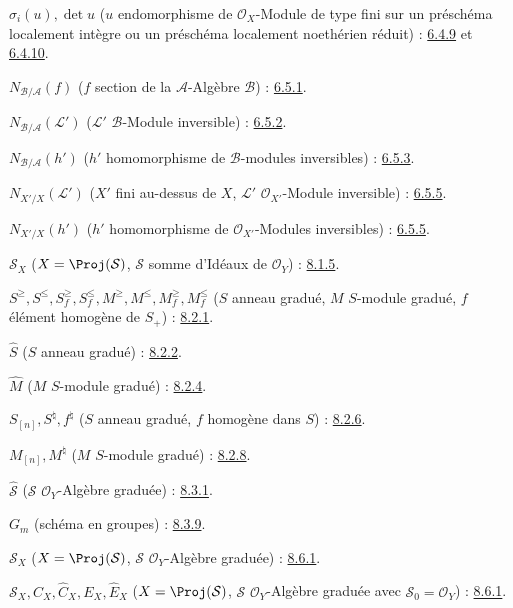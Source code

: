 $\sigma_i(u),\det u$
($u$ endomorphisme de $\mathcal{O}_X$-Module de type fini sur un préschéma
localement intègre ou un préschéma localement noethérien réduit) :
\hyperref[II.6.4.9-fr]{6.4.9} et \hyperref[II.6.4.10-fr]{6.4.10}.

$N_{\mathcal{B}/\mathcal{A}}(f)$
($f$ section de la $\mathcal{A}$-Algèbre $\mathcal{B}$) : \hyperref[II.6.5.1-fr]{6.5.1}.

$N_{\mathcal{B}/\mathcal{A}}(\mathcal{L}')$
($\mathcal{L}'$ $\mathcal{B}$-Module inversible) : \hyperref[II.6.5.2-fr]{6.5.2}.

$N_{\mathcal{B}/\mathcal{A}}(h')$
($h'$ homomorphisme de $\mathcal{B}$-modules inversibles) : \hyperref[II.6.5.3-fr]{6.5.3}.

$N_{X'/X}(\mathcal{L}')$
($X'$ fini au-dessus de $X$, $\mathcal{L}'$ $\mathcal{O}_{X'}$-Module inversible) : \hyperref[II.6.5.5-fr]{6.5.5}.

$N_{X'/X}(h')$
($h'$ homomorphisme de $\mathcal{O}_{X'}$-Modules inversibles) : \hyperref[II.6.5.5-fr]{6.5.5}.

$\mathcal{S}_X$ ($X=\Proj(\mathcal{S})$, $\mathcal{S}$ somme d'Idéaux de
$\mathcal{O}_Y$) : \hyperref[II.8.1.5-fr]{8.1.5}.

$S^\geq,S^\leq,S_f^\geq,S_f^\leq,
M^\geq,M^\leq,M_f^\geq,M_f^\leq$
($S$ anneau gradué, $M$ $S$-module gradué,
$f$ élément homogène de $S_+$) : \hyperref[II.8.2.1-fr]{8.2.1}.

$\widehat S$ ($S$ anneau gradué) : \hyperref[II.8.2.2-fr]{8.2.2}.

$\widehat M$ ($M$ $S$-module gradué) : \hyperref[II.8.2.4-fr]{8.2.4}.

$S_{[n]},S^\natural,f^\natural$
($S$ anneau gradué, $f$ homogène dans $S$) : \hyperref[II.8.2.6-fr]{8.2.6}.

$M_{[n]},M^\natural$ ($M$ $S$-module gradué) : \hyperref[II.8.2.8-fr]{8.2.8}.

$\widehat{\mathcal{S}}$ ($\mathcal{S}$ $\mathcal{O}_Y$-Algèbre graduée) : \hyperref[II.8.3.1-fr]{8.3.1}.

$G_m$ (schéma en groupes) : \hyperref[II.8.3.9-fr]{8.3.9}.

$\mathcal{S}_X$ ($X=\Proj(\mathcal{S})$, $\mathcal{S}$ $\mathcal{O}_Y$-Algèbre graduée) : \hyperref[II.8.6.1-fr]{8.6.1}.

$\mathcal{S}_X,C_X,\widehat C_X,E_X,\widehat E_X$
($X=\Proj(\mathcal{S})$, $\mathcal{S}$ $\mathcal{O}_Y$-Algèbre graduée
avec $\mathcal{S}_0=\mathcal{O}_Y$) : \hyperref[II.8.6.1-fr]{8.6.1}.


